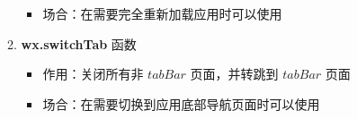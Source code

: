 \begin{enumerate}
\begin{mquote}
\begin{enumerate}
\begin{itemize}
                                \item 场合：在需要完全重新加载应用时可以使用
                            \end{itemize}
                        \item \textbf{wx.switchTab} 函数
                            \begin{itemize}
                                \item 作用：关闭所有非 $tabBar$ 页面，并转跳到 $tabBar$ 页面
                                \item 场合：在需要切换到应用底部导航页面时可以使用
                            \end{itemize}
                    \end{enumerate}
                \end{mquote}
        \end{enumerate}

